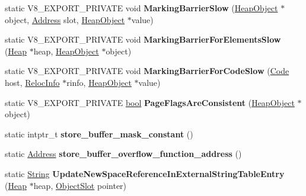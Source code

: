 \begin{DoxyCompactItemize}
static V8\+\_\+\+E\+X\+P\+O\+R\+T\+\_\+\+P\+R\+I\+V\+A\+TE void {\bfseries Marking\+Barrier\+Slow} (\mbox{\hyperlink{classv8_1_1internal_1_1HeapObject}{Heap\+Object}} $\ast$object, \mbox{\hyperlink{classuintptr__t}{Address}} slot, \mbox{\hyperlink{classv8_1_1internal_1_1HeapObject}{Heap\+Object}} $\ast$value)
\item 
\mbox{\label{classv8_1_1internal_1_1Heap_abda28c9eea4ff4fe127d36eff791257d}} 
static V8\+\_\+\+E\+X\+P\+O\+R\+T\+\_\+\+P\+R\+I\+V\+A\+TE void {\bfseries Marking\+Barrier\+For\+Elements\+Slow} (\mbox{\hyperlink{classv8_1_1internal_1_1Heap}{Heap}} $\ast$heap, \mbox{\hyperlink{classv8_1_1internal_1_1HeapObject}{Heap\+Object}} $\ast$object)
\item 
\mbox{\label{classv8_1_1internal_1_1Heap_af42f71211d8ccb584e379fe3905aa71a}} 
static V8\+\_\+\+E\+X\+P\+O\+R\+T\+\_\+\+P\+R\+I\+V\+A\+TE void {\bfseries Marking\+Barrier\+For\+Code\+Slow} (\mbox{\hyperlink{classv8_1_1internal_1_1Code}{Code}} host, \mbox{\hyperlink{classv8_1_1internal_1_1RelocInfo}{Reloc\+Info}} $\ast$rinfo, \mbox{\hyperlink{classv8_1_1internal_1_1HeapObject}{Heap\+Object}} $\ast$value)
\item 
\mbox{\label{classv8_1_1internal_1_1Heap_a97a3decc541ab26622e02ff99da161fe}} 
static V8\+\_\+\+E\+X\+P\+O\+R\+T\+\_\+\+P\+R\+I\+V\+A\+TE \mbox{\hyperlink{classbool}{bool}} {\bfseries Page\+Flags\+Are\+Consistent} (\mbox{\hyperlink{classv8_1_1internal_1_1HeapObject}{Heap\+Object}} $\ast$object)
\item 
\mbox{\label{classv8_1_1internal_1_1Heap_ab7cdcdfd5d71a394f5b2320186427ae1}} 
static intptr\+\_\+t {\bfseries store\+\_\+buffer\+\_\+mask\+\_\+constant} ()
\item 
\mbox{\label{classv8_1_1internal_1_1Heap_a4de5c41dc95c047ed719ec4b2e9d1516}} 
static \mbox{\hyperlink{classuintptr__t}{Address}} {\bfseries store\+\_\+buffer\+\_\+overflow\+\_\+function\+\_\+address} ()
\item 
\mbox{\label{classv8_1_1internal_1_1Heap_ad6fa95a1308d3d582c3fb2cbdf915873}} 
static \mbox{\hyperlink{classv8_1_1internal_1_1String}{String}} {\bfseries Update\+New\+Space\+Reference\+In\+External\+String\+Table\+Entry} (\mbox{\hyperlink{classv8_1_1internal_1_1Heap}{Heap}} $\ast$heap, \mbox{\hyperlink{classv8_1_1internal_1_1ObjectSlot}{Object\+Slot}} pointer)

\end{DoxyCompactItemize}
